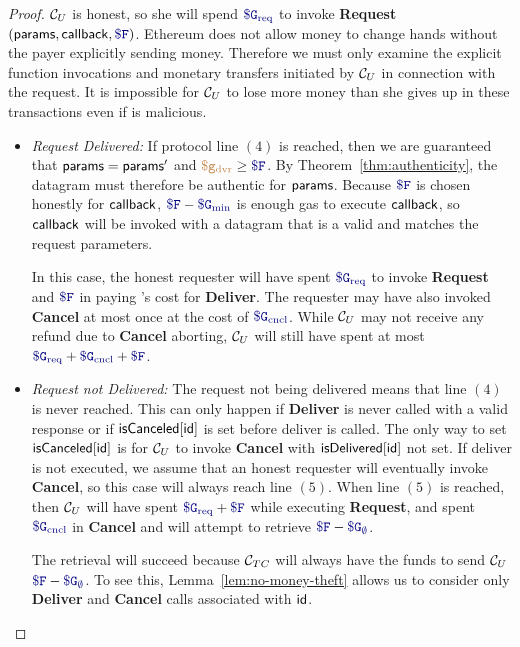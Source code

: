 \begin{proof}
${\cal C}_U$ is honest, so she will spend $\constgasrequest$ to invoke {\bf Request}$(\dgform, \dgcallback, \consthonestfee)$.
Ethereum does not allow money to change hands without the payer explicitly sending money.
Therefore we must only examine the explicit function invocations and monetary transfers initiated by ${\cal C}_U$ in connection with the request.
It is impossible for ${\cal C}_U$ to lose more money than she gives up in these transactions even if \tc is malicious.

\begin{itemize}
\item {\it Request Delivered:}
If protocol line $(4)$ is reached, then we are guaranteed that ${\sf params} = {\sf params}'$ and $\gasdeliver \geq \consthonestfee$.
By Theorem~\ref{thm:authenticity}, the datagram must therefore be authentic for ${\sf params}$.
Because $\consthonestfee$ is chosen honestly for ${\sf callback}$, $\consthonestfee - \constgasmin$ is enough gas to execute ${\sf callback}$,
so ${\sf callback}$ will be invoked with a datagram that is a valid and matches the request parameters.

In this case, the honest requester will have spent $\constgasrequest$ to invoke {\bf Request} and $\consthonestfee$ in paying \tc's cost for {\bf Deliver}.
The requester may have also invoked {\bf Cancel} at most once at the cost of $\constgasinvokecancel$.
While ${\cal C}_U$ may not receive any refund due to {\bf Cancel} aborting, ${\cal C}_U$ will still have spent at most $\constgasrequest + \constgasinvokecancel + \consthonestfee$.


\item {\it Request not Delivered:}
The request not being delivered means that line $(4)$ is never reached.
This can only happen if {\bf Deliver} is never called with a valid response or if ${\sf isCanceled}[{\sf id}]$ is set before deliver is called.
The only way to set ${\sf isCanceled}[{\sf id}]$ is for ${\cal C}_U$ to invoke {\bf Cancel} with ${\sf isDelivered}[{\sf id}]$ not set.
If deliver is not executed, we assume that an honest requester will eventually invoke {\bf Cancel}, so this case will always reach line $(5)$.
When line $(5)$ is reached, then ${\cal C}_U$ will have spent $\constgasrequest + \consthonestfee$ while executing {\bf Request},
and spent $\constgasinvokecancel$ in {\bf Cancel} and will attempt to retrieve $\consthonestfee - \constgascancel$.

The retrieval will succeed because ${\cal C}_{TC}$ will always have the funds to send ${\cal C}_U$ $\consthonestfee - \constgascancel$.
To see this, Lemma~\ref{lem:no-money-theft} allows us to consider only {\bf Deliver} and {\bf Cancel} calls associated with ${\sf id}$.


\end{itemize}
\end{proof}
